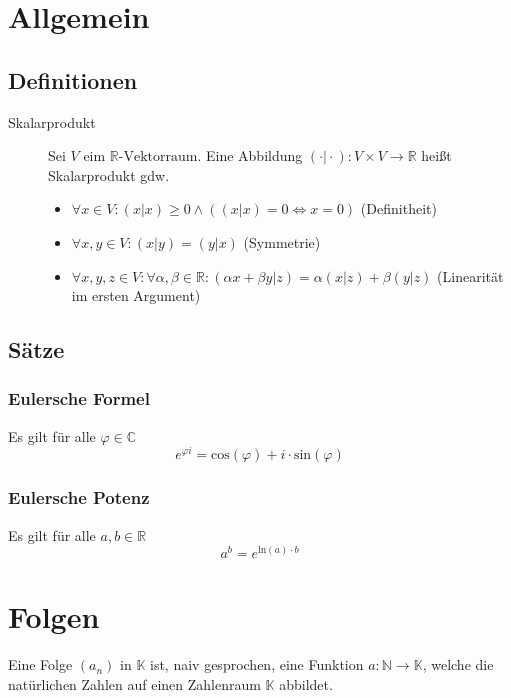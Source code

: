 


\chapter{Allgemein}
    \section{Definitionen}
        \begin{description}
            \item[Skalarprodukt] Sei $ V $ eim $ \mathbb{R}\text{-Vektorraum} $. Eine Abbildung $ (\cdot \vert \cdot) : V \times V \rightarrow \mathbb{R} $ heißt Skalarprodukt gdw.
                \begin{itemize}
                    \item $ \forall x \in V : (x \vert x) \geq 0 \land ((x \vert x) = 0 \iff x = 0) $ (Definitheit)
                    \item $ \forall x, y \in V : (x \vert y) = (y \vert x) $ (Symmetrie)
                    \item $ \forall x, y, z \in V : \forall \alpha, \beta \in \mathbb{R} : (\alpha x + \beta y \vert z) = \alpha (x \vert z) + \beta (y \vert z) $ (Linearität im ersten Argument)
                \end{itemize}
        \end{description}

    \section{Sätze}
        \subsection{Eulersche Formel}
            Es gilt für alle $ \varphi \in \mathbb{C} $ \[ e ^ { \varphi i } = \text{cos}(\varphi) + i \cdot \text{sin}(\varphi) \]

        \subsection{Eulersche Potenz}
            Es gilt für alle $ a, b \in \mathbb{R} $ \[ a ^ b = e ^ { \text{ln}(a) \cdot b } \]

\chapter{Folgen}
    Eine Folge $ (a _ n) $ in $ \mathbb{K} $ ist, naiv gesprochen, eine Funktion $ a : \mathbb{N} \rightarrow \mathbb{K} $, welche die natürlichen Zahlen auf einen Zahlenraum $ \mathbb{K} $ abbildet.

